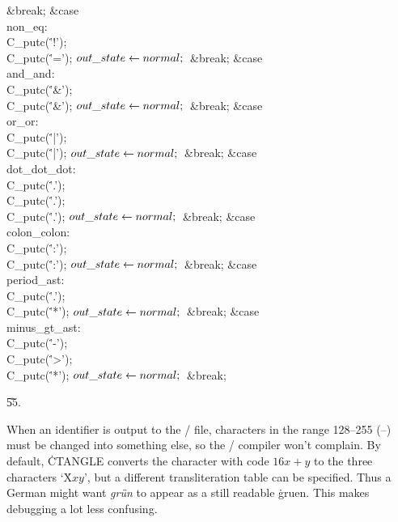 \&{break};\6
\4\&{case} \\{non\_eq}:\5
\\{C\_putc}(\.{'!'});\5
\\{C\_putc}(\.{'='});\6
${}\\{out\_state}\leftarrow\\{normal};{}$\6
\&{break};\6
\4\&{case} \\{and\_and}:\5
\\{C\_putc}(\.{'\&'});\5
\\{C\_putc}(\.{'\&'});\6
${}\\{out\_state}\leftarrow\\{normal};{}$\6
\&{break};\6
\4\&{case} \\{or\_or}:\5
\\{C\_putc}(\.{'|'});\5
\\{C\_putc}(\.{'|'});\6
${}\\{out\_state}\leftarrow\\{normal};{}$\6
\&{break};\6
\4\&{case} \\{dot\_dot\_dot}:\5
\\{C\_putc}(\.{'.'});\5
\\{C\_putc}(\.{'.'});\5
\\{C\_putc}(\.{'.'});\6
${}\\{out\_state}\leftarrow\\{normal};{}$\6
\&{break};\6
\4\&{case} \\{colon\_colon}:\5
\\{C\_putc}(\.{':'});\5
\\{C\_putc}(\.{':'});\6
${}\\{out\_state}\leftarrow\\{normal};{}$\6
\&{break};\6
\4\&{case} \\{period\_ast}:\5
\\{C\_putc}(\.{'.'});\5
\\{C\_putc}(\.{'*'});\6
${}\\{out\_state}\leftarrow\\{normal};{}$\6
\&{break};\6
\4\&{case} \\{minus\_gt\_ast}:\5
\\{C\_putc}(\.{'-'});\5
\\{C\_putc}(\.{'>'});\5
\\{C\_putc}(\.{'*'});\6
${}\\{out\_state}\leftarrow\\{normal};{}$\6
\&{break};\par
\U55.\fi

When an identifier is output to the \CEE/ file, characters in the range
128--255 (--) must be changed into something else,
so the \CEE/
compiler won't complain.  By default, \.{CTANGLE} converts the
character with code $16 x+y$ to the three characters `\.X$xy$', but
a different transliteration table can be specified.  Thus a German
might want {\it gr\"un\/} to appear as a still readable \.{gruen}.
This makes debugging a lot less confusing.

